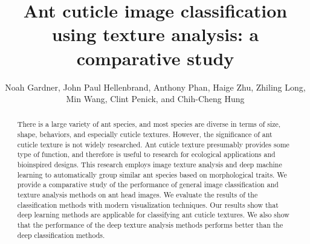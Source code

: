 \documentclass{aci}
\numberwithin{equation}{section}
\begin{document}
\title{Ant cuticle image classification using texture analysis: a comparative study}

\author{%
    Noah Gardner,
    John Paul Hellenbrand,
    Anthony Phan,
    Haige Zhu,
    Zhiling Long,
    Min Wang,
    Clint Penick,
    and Chih-Cheng Hung\corrauth
}%


\address{%
}


\begin{abstract}
    There is a large variety of ant species, and most species are diverse in
    terms of size, shape, behaviors, and especially cuticle textures. However,
    the significance of ant cuticle texture is not widely researched. Ant
    cuticle texture presumably provides some type of function, and therefore is
    useful to research for ecological applications and bioinspired designs. This
    research employs image texture analysis and deep machine learning to
    automatically group similar ant species based on morphological traits. We
    provide a comparative study of the performance of general image
    classification and texture analysis methods on ant head images. We evaluate
    the results of the classification methods with modern visualization
    techniques. Our results show that deep learning methods are applicable for
    classifying ant cuticle textures. We also show that the performance of the
    deep texture analysis methods performs better than the deep classification
    methods.
\end{abstract}
\maketitle
\end{document}

